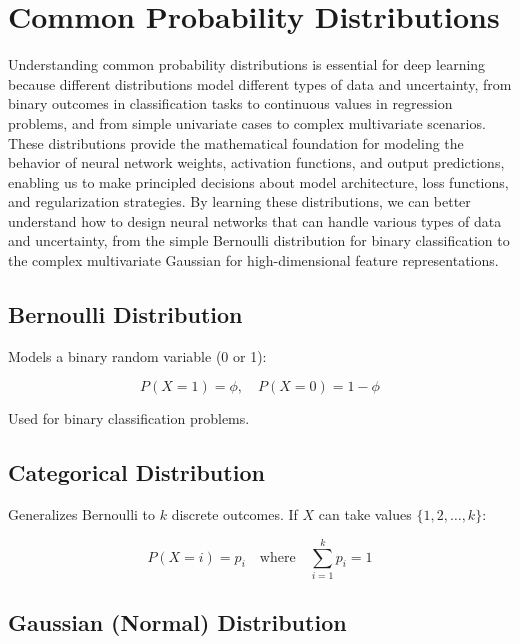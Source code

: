 
\section{Common Probability Distributions }
\label{sec:common-distributions}

Understanding common probability distributions is essential for deep learning because different distributions model different types of data and uncertainty, from binary outcomes in classification tasks to continuous values in regression problems, and from simple univariate cases to complex multivariate scenarios. These distributions provide the mathematical foundation for modeling the behavior of neural network weights, activation functions, and output predictions, enabling us to make principled decisions about model architecture, loss functions, and regularization strategies. By learning these distributions, we can better understand how to design neural networks that can handle various types of data and uncertainty, from the simple Bernoulli distribution for binary classification to the complex multivariate Gaussian for high-dimensional feature representations.

\subsection{Bernoulli Distribution}

Models a binary random variable (0 or 1):

\begin{equation}
P(X=1) = \phi, \quad P(X=0) = 1-\phi
\end{equation}

Used for binary classification problems.

\subsection{Categorical Distribution}

Generalizes Bernoulli to $k$ discrete outcomes. If $X$ can take values $\{1, 2, \ldots, k\}$:

\begin{equation}
P(X=i) = p_i \quad \text{where} \quad \sum_{i=1}^{k} p_i = 1
\end{equation}

\subsection{Gaussian (Normal) Distribution}

